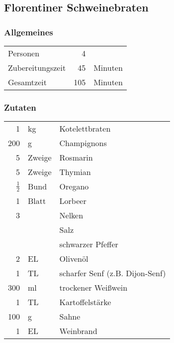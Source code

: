 \subsection{Florentiner Schweinebraten}
\subsubsection*{Allgemeines}
\begin{tabular}{lrl}
	Personen         &   4 &  \\
	Zubereitungszeit &  45 & Minuten \\
	Gesamtzeit       & 105 & Minuten \\
\end{tabular} 

\subsubsection*{Zutaten}
\begin{tabular}{rll}
	          1 & kg       & Kotelettbraten                   \\
	          200 & g       & Champignons                     \\
	            5 & Zweige  & Rosmarin                        \\
	            5 & Zweige  & Thymian                         \\
	$ \frac{1}{2}$ & Bund    & Oregano                        \\
	          1 & Blatt & Lorbeer               \\
	            3 &       & Nelken\\
	              &         & Salz                            \\
	              &         & schwarzer Pfeffer               \\
	            2 & EL      & Olivenöl                          \\
	            1 & TL      & scharfer Senf (z.B. Dijon-Senf) \\
	          300 & ml      & trockener Weißwein              \\
	            1 & TL      & Kartoffelstärke                 \\
	          100 & g       & Sahne                           \\
	            1 & EL      & Weinbrand
\end{tabular} 
